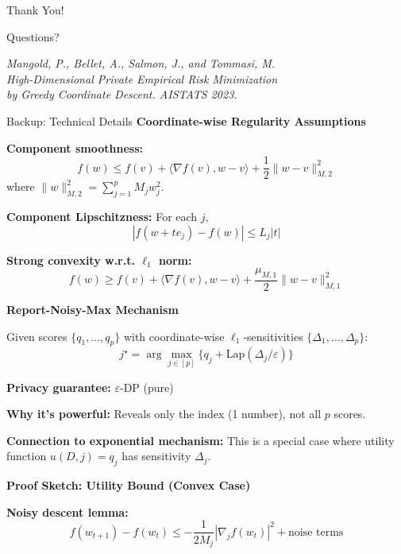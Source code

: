 \documentclass[10pt]{beamer}
\begin{document}
\begin{frame}[standout]
\Huge Thank You!
\vspace{2em}

\normalsize
Questions?

\vspace{2em}
\footnotesize
\textit{Mangold, P., Bellet, A., Salmon, J., and Tommasi, M.\\
High-Dimensional Private Empirical Risk Minimization\\
by Greedy Coordinate Descent. AISTATS 2023.}
\end{frame}

\appendix

\begin{frame}[allowframebreaks]{Backup: Technical Details}
\textbf{Coordinate-wise Regularity Assumptions}

\vspace{0.5em}
\textbf{Component smoothness:}
\[
f(w) \leq f(v) + \langle \nabla f(v), w - v \rangle + \frac{1}{2} \|w - v\|_{M,2}^2
\]
where $\|w\|_{M,2}^2 = \sum_{j=1}^p M_j w_j^2$.

\vspace{0.5em}
\textbf{Component Lipschitzness:} For each $j$,
\[
|f(w + t e_j) - f(w)| \leq L_j |t|
\]

\vspace{0.5em}
\textbf{Strong convexity w.r.t. $\ell_1$ norm:}
\[
f(w) \geq f(v) + \langle \nabla f(v), w - v \rangle + \frac{\mu_{M,1}}{2} \|w - v\|_{M,1}^2
\]

\framebreak

\textbf{Report-Noisy-Max Mechanism}

\vspace{0.5em}
Given scores $\{q_1, \ldots, q_p\}$ with coordinate-wise $\ell_1$-sensitivities $\{\Delta_1, \ldots, \Delta_p\}$:
\[
j^\star = \arg\max_{j \in [p]} \{q_j + \text{Lap}(\Delta_j / \varepsilon)\}
\]

\textbf{Privacy guarantee:} $\varepsilon$-DP (pure)

\textbf{Why it's powerful:} Reveals only the index (1 number), not all $p$ scores.

\textbf{Connection to exponential mechanism:} This is a special case where utility function $u(D, j) = q_j$ has sensitivity $\Delta_j$.

\framebreak

\textbf{Proof Sketch: Utility Bound (Convex Case)}

\vspace{0.5em}
\textbf{Noisy descent lemma:}
\[
f(w_{t+1}) - f(w_t) \leq -\frac{1}{2M_j} |\nabla_j f(w_t)|^2 + \text{noise terms}
\]


\end{frame}
\end{document}

